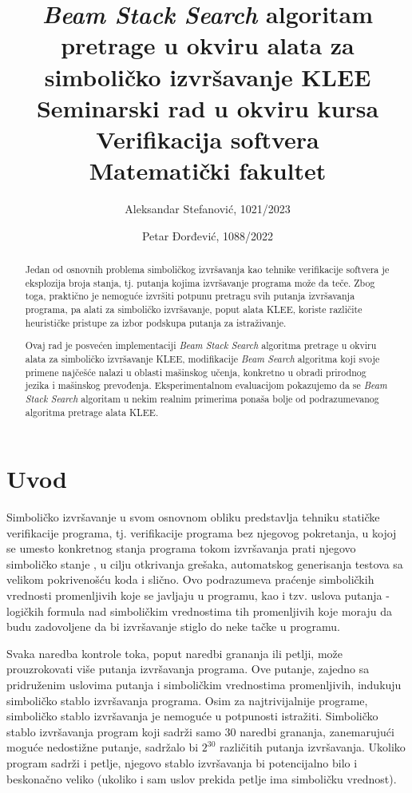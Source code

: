 \documentclass[a4paper]{article}
\title{\textit{Beam Stack Search} algoritam pretrage u okviru alata za simboličko izvršavanje KLEE\\ \small{Seminarski rad u okviru kursa\\Verifikacija softvera\\Matematički fakultet}}
\author{Aleksandar Stefanović, 1021/2023 \and Petar Đorđević, 1088/2022}
\begin{document}
\maketitle

\begin{abstract}

Jedan od osnovnih problema simboličkog izvršavanja kao tehnike verifikacije softvera je eksplozija broja stanja, tj. putanja kojima izvršavanje programa može da teče. Zbog toga, praktično je nemoguće izvršiti potpunu pretragu svih putanja izvršavanja programa, pa alati za simboličko izvršavanje, poput alata KLEE, koriste različite heurističke pristupe za izbor podskupa putanja za istraživanje.

Ovaj rad je posvećen implementaciji \textit{Beam Stack Search} algoritma pretrage u okviru alata za simboličko izvršavanje KLEE, modifikacije \textit{Beam Search} algoritma koji svoje primene najčešće nalazi u oblasti mašinskog učenja, konkretno u obradi prirodnog jezika i mašinskog prevođenja. Eksperimentalnom evaluacijom pokazujemo da se \textit{Beam Stack Search} algoritam u nekim realnim primerima ponaša bolje od podrazumevanog algoritma pretrage alata KLEE.

\end{abstract}

\tableofcontents

\newpage

\section{Uvod}

Simboličko izvršavanje u svom osnovnom obliku predstavlja tehniku statičke verifikacije programa, tj. verifikacije programa bez njegovog pokretanja, u kojoj se umesto konkretnog stanja programa tokom izvršavanja prati njegovo simboličko stanje \cite{SymExec-King-10.1145/360248.360252}, u cilju otkrivanja grešaka, automatskog generisanja testova sa velikom pokrivenošću koda i slično. Ovo podrazumeva praćenje simboličkih vrednosti promenljivih koje se javljaju u programu, kao i tzv. uslova putanja - logičkih formula nad simboličkim vrednostima tih promenljivih koje moraju da budu zadovoljene da bi izvršavanje stiglo do neke tačke u programu.

Svaka naredba kontrole toka, poput naredbi grananja ili petlji, može prouzrokovati više putanja izvršavanja programa. Ove putanje, zajedno sa pridruženim uslovima putanja i simboličkim vrednostima promenljivih, indukuju simboličko stablo izvršavanja programa. Osim za najtrivijalnije programe, simboličko stablo izvršavanja je nemoguće u potpunosti istražiti. Simboličko stablo izvršavanja program koji sadrži samo $30$ naredbi grananja, zanemarujući moguće nedostižne putanje, sadržalo bi $2^{30}$ različitih putanja izvršavanja. Ukoliko program sadrži i petlje, njegovo stablo izvršavanja bi potencijalno bilo i beskonačno veliko (ukoliko i sam uslov prekida petlje ima simboličku vrednost).
\end{document}
